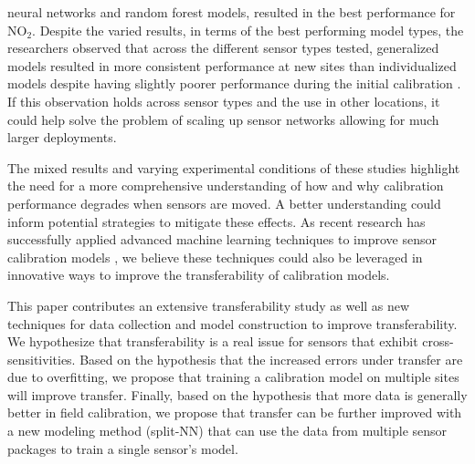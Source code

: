 \documentclass[journal abbreviation, manuscript]{copernicus}
\newcommand{\textus}[1]{$_{\text{#1}}$}
\begin{document}
neural networks and random forest models, resulted in the best performance for NO\textus{2}.  Despite the varied results, in terms of the best performing model types, the researchers observed that across the different sensor types tested, generalized models resulted in more consistent performance at new sites than individualized models despite having slightly poorer performance during the initial calibration \citep{Malings2018Development}.  If this observation holds across sensor types and the use in other locations, it could help solve the problem of scaling up sensor networks allowing for much larger deployments. 

The mixed results and varying experimental conditions of these studies highlight the need for a more comprehensive understanding of how and why calibration performance degrades when sensors are moved. A better understanding could inform potential strategies to mitigate these effects.  As recent research has successfully applied advanced machine learning techniques to improve sensor calibration models \citep{Zimmerman2018, DeVito2009, Casey2018Performance}, we believe these techniques could also be leveraged in innovative ways to improve the transferability of calibration models.

This paper contributes an extensive transferability study as well as new techniques for data collection and model construction to improve transferability.  We hypothesize that transferability is a real issue for sensors that exhibit cross-sensitivities.   Based on the hypothesis that the increased errors under transfer are due to overfitting, we propose that training a calibration model on multiple sites will improve transfer.  Finally, based on the hypothesis that more data is generally better in field calibration, we propose that transfer can be further improved with a new modeling method (split-NN) that can use the data from multiple sensor packages to train a single sensor's model.

\end{document}
